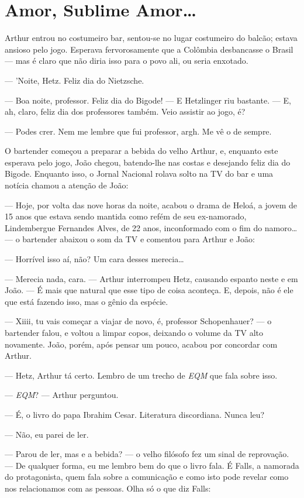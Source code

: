\chapter{Amor, Sublime Amor\ldots}

Arthur entrou no costumeiro bar, sentou-se no lugar costumeiro do balcão; estava ansioso pelo jogo. Esperava fervorosamente que a Colômbia desbancasse o Brasil --- mas é claro que não diria isso para o povo ali, ou seria enxotado.

--- 'Noite, Hetz. Feliz dia do Nietzsche.

--- Boa noite, professor. Feliz dia do Bigode! --- E Hetzlinger riu bastante. --- E, ah, claro, feliz dia dos professores também. Veio assistir ao jogo, é?

--- Podes crer. Nem me lembre que fui professor, argh. Me vê o de sempre.

O bartender começou a preparar a bebida do velho Arthur, e, enquanto este esperava pelo jogo, João chegou, batendo-lhe nas costas e desejando feliz dia do Bigode. Enquanto isso, o Jornal Nacional rolava solto na TV do bar e uma notícia chamou a atenção de João:

--- Hoje, por volta das nove horas da noite, acabou o drama de Heloá, a jovem de 15 anos que estava sendo mantida como refém de seu ex-namorado, Lindembergue Fernandes Alves, de 22 anos, inconformado com o fim do namoro\ldots\,--- o bartender abaixou o som da TV e comentou para Arthur e João:

--- Horrível isso aí, não? Um cara desses merecia\ldots

--- Merecia nada, cara. --- Arthur interrompeu Hetz, causando espanto neste e em João. --- É mais que natural que esse tipo de coisa aconteça. E, depois, não é ele que está fazendo isso, mas o gênio da espécie.

--- Xiiii, tu vais começar a viajar de novo, é, professor Schopenhauer? --- o bartender falou, e voltou a limpar copos, deixando o volume da TV alto novamente. João, porém, após pensar um pouco, acabou por concordar com Arthur.

--- Hetz, Arthur tá certo. Lembro de um trecho de \emph{EQM} que fala sobre isso.

--- \emph{EQM}? --- Arthur perguntou.

--- É, o livro do papa Ibrahim Cesar. Literatura discordiana. Nunca leu?

--- Não, eu parei de ler.

--- Parou de ler, mas e a bebida? --- o velho filósofo fez um sinal de reprovação. --- De qualquer forma, eu me lembro bem do que o livro fala. É Falls, a namorada do protagonista, quem fala sobre a comunicação e como isto pode revelar como nos relacionamos com as pessoas. Olha só o que diz Falls:

